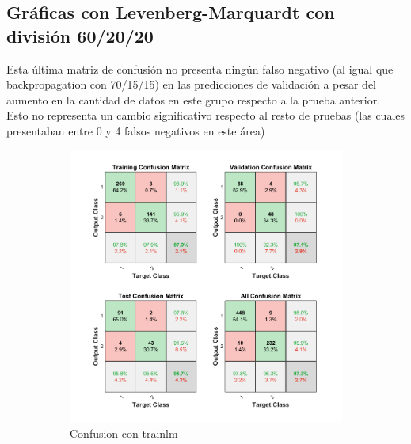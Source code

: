 \documentclass[a4paper, 12pt]{article}
\begin{document}
            \subsection{Gráficas con Levenberg-Marquardt con división 60/20/20}
                Esta última matriz de confusión no presenta ningún falso negativo (al igual que backpropagation con 70/15/15) en las predicciones de validación a pesar del aumento en la cantidad de datos en este grupo respecto a la prueba anterior. Esto no representa un cambio significativo respecto al resto de pruebas (las cuales presentaban entre 0 y 4 falsos negativos en este área)
                \begin{figure}[htp!]
                    \caption{Gráficas con Levenberg-Marquardt con división 60/20/20}
                    \begin{subfigure}{0.49\textwidth}
                        \centering
        		      \includegraphics[width=\textwidth]{figures/parte1/Ej4/ej4_confusion_trainlm_60.png}
                        \caption{Confusion con trainlm}
                    \end{subfigure}
                    \begin{subfigure}{0.49\textwidth}

\end{subfigure}
\end{figure}
\end{document}
